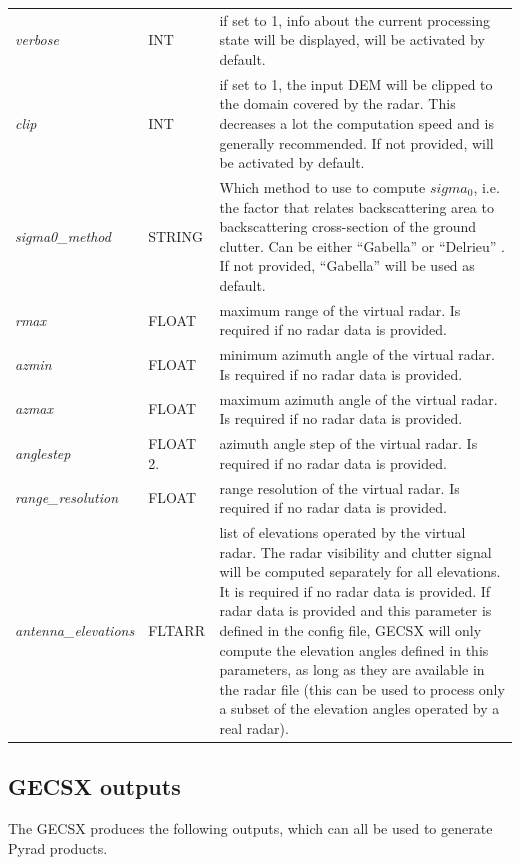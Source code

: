 \documentclass[a4paper,11pt,pdftex,twoside]{scrartcl}
\begin{document}
{{{\begin{longtable}{p{}p{}p{}}
    \textit{verbose} & INT & if set to 1, info about the current processing state will be displayed, will be activated by default. \\
    \textit{clip} & INT & if set to 1, the input DEM will be clipped to the domain covered by the radar. This decreases a lot the computation speed and is generally recommended. If not provided, will be activated by default. \\
    \textit{sigma0\_method} & STRING & Which method to use to compute $sigma_0$, i.e. the factor that relates backscattering area to backscattering cross-section of the ground clutter. Can be either ``Gabella'' \citep{Gabella_JAOT_1998} or ``Delrieu'' \citep{Delrieu_JAOT_1995}. If not provided,  ``Gabella'' will be used as default.\\
     \textit{rmax}  &  FLOAT & maximum range of the virtual radar. Is required if no radar data is provided.\\
    \textit{azmin}   & FLOAT & minimum azimuth angle of the virtual radar. Is required if no radar data is provided.\\
    \textit{azmax}    &    FLOAT & maximum azimuth angle of the virtual radar. Is required if no radar data is provided.\\
    \textit{anglestep}  &  FLOAT 2.  & azimuth angle step of the virtual radar. Is required if no radar data is provided.\\
    \textit{range\_resolution} & FLOAT & range resolution of the virtual radar. Is required if no radar data is provided.\\
    \textit{antenna\_elevations} & FLTARR & list of elevations operated by the virtual radar. The radar visibility and clutter signal will be computed separately for all elevations. It is required if no radar data is provided. If radar data is provided and this parameter is defined in the config file, GECSX will only compute the elevation angles defined in this parameters, as long as they are available in the radar file (this can be used to process only a subset of the elevation angles operated by a real radar).\\
\end{longtable} 

\subsection{GECSX outputs}

The GECSX produces the following outputs, which can all be used to generate Pyrad products.

}}}
\end{document}
